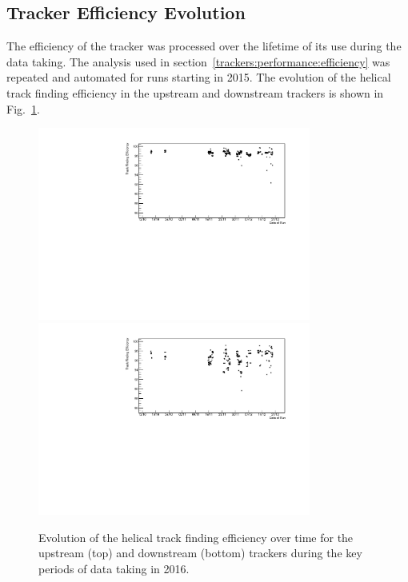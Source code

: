 \subsection{Tracker Efficiency Evolution}

The efficiency of the tracker was processed over the lifetime of its use during the data taking. The analysis used in section~\ref{trackers:performance:efficiency} was repeated and automated for runs starting in 2015. The evolution of the helical track finding efficiency in the upstream and downstream trackers is shown in Fig.~\ref{fig:trackers:performance:historical}.

\begin{figure}
  \centering
  \includegraphics[width=0.8\textwidth]{upstream_historical_efficiency__helical.pdf}
  \includegraphics[width=0.8\textwidth]{downstream_historical_efficiency__helical.pdf}
  \caption{\label{fig:trackers:performance:historical}Evolution of the helical track finding efficiency over time for the upstream (top) and downstream (bottom) trackers during the key periods of data taking in 2016.}
\end{figure}
